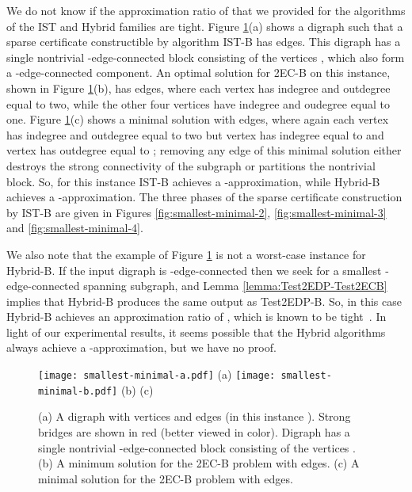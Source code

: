 \documentclass[11pt]{article}
\begin{document}
We do not know if the approximation ratio of  that we provided for the algorithms of the \textsf{IST} and \textsf{Hybrid} families are tight. Figure \ref{fig:smallest-minimal}(a) shows a digraph  such that a sparse certificate constructible by algorithm \textsf{IST-B} has  edges. This digraph has a single nontrivial -edge-connected block consisting of the vertices , which also form a -edge-connected component.
An optimal solution for \textsf{2EC-B} on this instance, shown in Figure \ref{fig:smallest-minimal}(b), has  edges, where each vertex  has indegree and outdegree equal to two, while the other four vertices have indegree and oudegree equal to one. Figure \ref{fig:smallest-minimal}(c) shows a minimal solution with  edges, where again each vertex  has indegree and outdegree equal to two but vertex  has indegree equal to  and vertex  has outdegree equal to ; removing any edge of this minimal solution either destroys the strong connectivity of the subgraph or partitions the nontrivial block.  So, for this instance \textsf{IST-B} achieves a -approximation, while \textsf{Hybrid-B} achieves a -approximation.
The three phases of the sparse certificate construction by \textsf{IST-B} are given in Figures \ref{fig:smallest-minimal-2}, \ref{fig:smallest-minimal-3} and \ref{fig:smallest-minimal-4}.

We also note that the example of Figure \ref{fig:smallest-minimal} is not a worst-case instance for \textsf{Hybrid-B}. If the input digraph is -edge-connected then we seek for a smallest -edge-connected spanning subgraph, and Lemma \ref{lemma:Test2EDP-Test2ECB} implies that \textsf{Hybrid-B} produces the same output as \textsf{Test2EDP-B}. So, in this case \textsf{Hybrid-B} achieves an approximation ratio of , which is known to be tight~\cite{CT00}. 
In light of our experimental results, it seems possible that the \textsf{Hybrid} algorithms always achieve a -approximation, but we have no proof.

\begin{figure}[t!]
\begin{center}
\texttt{[image: smallest-minimal-a.pdf]}
(a)
\texttt{[image: smallest-minimal-b.pdf]}
(b) \hspace{7.5cm} (c) \hspace{2.5cm}
\end{center}
\caption{(a) A digraph  with  vertices and  edges (in this instance ). Strong bridges are shown in red (better viewed in color). Digraph  has a single nontrivial  -edge-connected block consisting of the vertices . (b) A minimum solution for the \textsf{2EC-B} problem with  edges. (c) A minimal solution for the \textsf{2EC-B} problem with  edges.}
\label{fig:smallest-minimal}
\end{figure}
\end{document}
